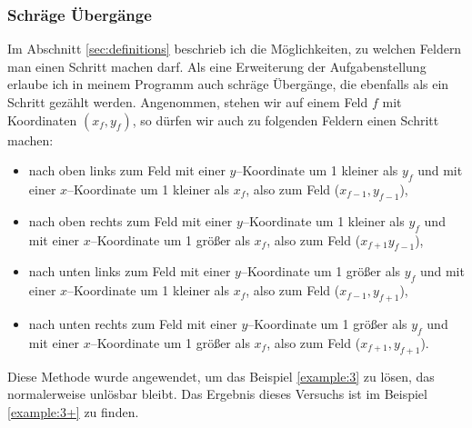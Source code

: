 \documentclass[a4paper,10pt,ngerman]{scrartcl}
\begin{document}
\subsubsection{Schräge Übergänge}\label{sec:slant}
Im Abschnitt \ref{sec:definitions} beschrieb ich die Möglichkeiten, zu welchen Feldern man einen Schritt machen darf.
Als eine Erweiterung der Aufgabenstellung erlaube ich in meinem Programm auch schräge Übergänge, die ebenfalls
als ein Schritt gezählt werden. Angenommen, stehen wir auf einem Feld $f$ mit Koordinaten $(x_f, y_f)$, so dürfen wir auch zu folgenden Feldern
einen Schritt machen:
\begin{itemize}
  \item nach oben links zum Feld mit einer $y$--Koordinate um 1 kleiner als $y_f$ und mit einer $x$--Koordinate um 1 kleiner als $x_f$,
    also zum Feld ($x_{f-1},y_{f-1}$),
  \item nach oben rechts zum Feld mit einer $y$--Koordinate um 1 kleiner als $y_f$ und mit einer $x$--Koordinate um 1 größer als $x_f$,
    also zum Feld ($x_{f+1}y_{f-1}$),
  \item nach unten links zum Feld mit einer $y$--Koordinate um 1 größer als $y_f$ und mit einer $x$--Koordinate um 1 kleiner als $x_f$,
    also zum Feld ($x_{f-1},y_{f+1}$),
  \item nach unten rechts zum Feld mit einer $y$--Koordinate um 1 größer als $y_f$ und mit einer $x$--Koordinate um 1 größer als $x_f$,
    also zum Feld ($x_{f+1},y_{f+1}$).
\end{itemize}

Diese Methode wurde angewendet, um das Beispiel \ref{example:3} zu lösen, das normalerweise unlösbar bleibt.
Das Ergebnis dieses Versuchs ist im Beispiel \ref{example:3+} zu finden.

\printbibliography

\newpage
\end{document}
